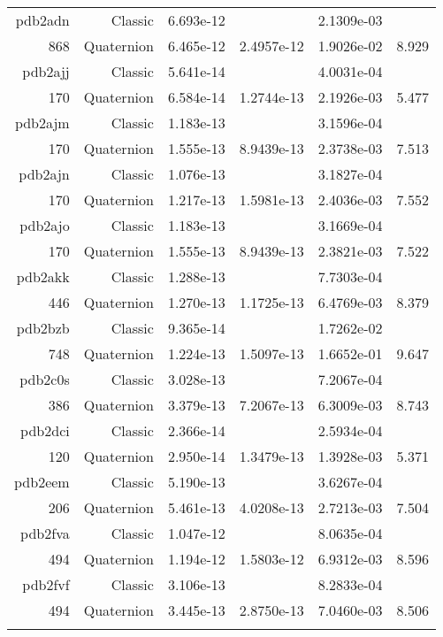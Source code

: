 \begin{xltabular}{\textwidth}{r|rS[table-format=1.3e+2]S[table-format=1.4e+2]S[table-format=1.4e+2]S[table-format=-1.3]}
pdb2adn & Classic & 6.693e-12 &  & 2.1309e-03 & \\
868 & Quaternion & 6.465e-12 & 2.4957e-12 & 1.9026e-02 & 8.929\\  \addlinespace
pdb2ajj & Classic & 5.641e-14 &  & 4.0031e-04 & \\
170 & Quaternion & 6.584e-14 & 1.2744e-13 & 2.1926e-03 & 5.477\\  \addlinespace
pdb2ajm & Classic & 1.183e-13 &  & 3.1596e-04 & \\
170 & Quaternion & 1.555e-13 & 8.9439e-13 & 2.3738e-03 & 7.513\\  \addlinespace
pdb2ajn & Classic & 1.076e-13 &  & 3.1827e-04 & \\
170 & Quaternion & 1.217e-13 & 1.5981e-13 & 2.4036e-03 & 7.552\\  \addlinespace
pdb2ajo & Classic & 1.183e-13 &  & 3.1669e-04 & \\
170 & Quaternion & 1.555e-13 & 8.9439e-13 & 2.3821e-03 & 7.522\\  \addlinespace
pdb2akk & Classic & 1.288e-13 &  & 7.7303e-04 & \\
446 & Quaternion & 1.270e-13 & 1.1725e-13 & 6.4769e-03 & 8.379\\  \addlinespace
pdb2bzb & Classic & 9.365e-14 &  & 1.7262e-02 & \\
748 & Quaternion & 1.224e-13 & 1.5097e-13 & 1.6652e-01 & 9.647\\  \addlinespace
pdb2c0s & Classic & 3.028e-13 &  & 7.2067e-04 & \\
386 & Quaternion & 3.379e-13 & 7.2067e-13 & 6.3009e-03 & 8.743\\  \addlinespace
pdb2dci & Classic & 2.366e-14 &  & 2.5934e-04 & \\
120 & Quaternion & 2.950e-14 & 1.3479e-13 & 1.3928e-03 & 5.371\\  \addlinespace
pdb2eem & Classic & 5.190e-13 &  & 3.6267e-04 & \\
206 & Quaternion & 5.461e-13 & 4.0208e-13 & 2.7213e-03 & 7.504\\  \addlinespace
pdb2fva & Classic & 1.047e-12 &  & 8.0635e-04 & \\
494 & Quaternion & 1.194e-12 & 1.5803e-12 & 6.9312e-03 & 8.596\\  \addlinespace
pdb2fvf & Classic & 3.106e-13 &  & 8.2833e-04 & \\
494 & Quaternion & 3.445e-13 & 2.8750e-13 & 7.0460e-03 & 8.506\\  \addlinespace

\end{xltabular}
